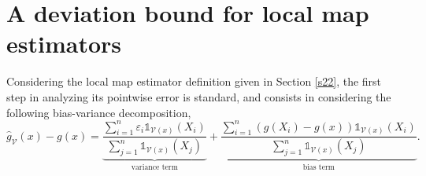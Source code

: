 \documentclass[paper=a4, fontsize=11pt]{scrartcl}
\newcommand{\ind}{\mathds{1}}
\begin{document}







 


\section{A deviation bound for local map estimators}\label{s30}
Considering the local map estimator definition given in Section \ref{s22}, the first step in analyzing its pointwise error is standard, and consists in considering the following bias-variance decomposition,
\begin{equation*}
    \hat g_{\mathcal V}(x) - g(x) = \underbrace{\frac{\sum_{i=1}^n \varepsilon_i \mathds 1 _{ \mathcal V(x) }(X_i)}{\sum_{j=1}^n \mathds 1 _{ \mathcal V(x) }(X_j)}}_{\text{variance term}}+\underbrace{\frac{\sum_{i=1}^n \left(g(X_i) - g(x)\right) \mathds 1 _{ \mathcal V(x) }(X_i)}{\sum_{j=1}^n \mathds 1 _{ \mathcal V(x) }(X_j)}}_{\text{bias term}}.
\end{equation*}
\end{document}
